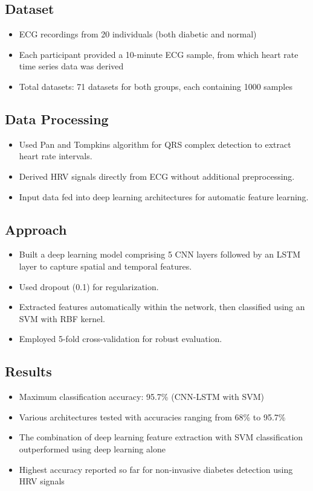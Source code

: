 \subsection*{Dataset}
\begin{itemize}
    \item ECG recordings from 20 individuals (both diabetic and normal)
    \item Each participant provided a 10-minute ECG sample, from which heart rate time series data was derived
    \item Total datasets: 71 datasets for both groups, each containing 1000 samples
\end{itemize}

\subsection*{Data Processing}
\begin{itemize}
    \item Used Pan and Tompkins algorithm for QRS complex detection to extract heart rate intervals.
    \item Derived HRV signals directly from ECG without additional preprocessing.
    \item Input data fed into deep learning architectures for automatic feature learning.
\end{itemize}

\subsection*{Approach}
\begin{itemize}
    \item Built a deep learning model comprising 5 CNN layers followed by an LSTM layer to capture spatial and temporal features.
    \item Used dropout (0.1) for regularization.
    \item Extracted features automatically within the network, then classified using an SVM with RBF kernel.
    \item Employed 5-fold cross-validation for robust evaluation.
\end{itemize}
\subsection*{Results}
\begin{itemize}
    \item Maximum classification accuracy: 95.7\% (CNN-LSTM with SVM)
    \item Various architectures tested with accuracies ranging from 68\% to 95.7\%
    \item The combination of deep learning feature extraction with SVM classification outperformed using deep learning alone
    \item Highest accuracy reported so far for non-invasive diabetes detection using HRV signals
\end{itemize}

